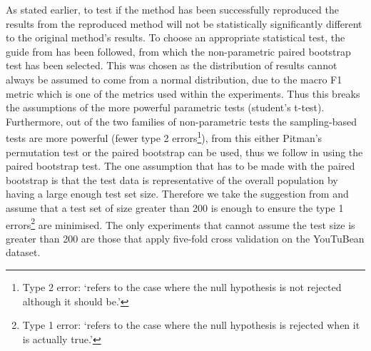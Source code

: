 As stated earlier, to test if the method has been successfully reproduced the results from the reproduced method will not be statistically significantly different to the original method's results. To choose an appropriate statistical test, the guide from \citet{dror-etal-2018-hitchhikers} has been followed, from which the non-parametric paired bootstrap test \citep{efron_1993} has been selected. This was chosen as the distribution of results cannot always be assumed to come from a normal distribution, due to the macro F1 metric \citep{dror-etal-2018-hitchhikers} which is one of the metrics used within the experiments. Thus this breaks the assumptions of the more powerful parametric tests (student's t-test). Furthermore, out of the two families of non-parametric tests the sampling-based tests are more powerful \citep{dror-etal-2018-hitchhikers, sogaard-etal-2014-whats} (fewer type 2 errors\footnote{Type 2 error: `refers to the case where the null hypothesis is not rejected although it should be.'\citep{dror-etal-2018-hitchhikers}}), from this either Pitman's permutation test or the paired bootstrap can be used, thus we follow \citet{sogaard-etal-2014-whats} in using the paired bootstrap test. The one assumption that has to be made with the paired bootstrap is that the test data is representative of the overall population by having a large enough test set size. Therefore we take the suggestion from \citet{sogaard-etal-2014-whats} and assume that a test set of size greater than 200 is enough to ensure the type 1 errors\footnote{Type 1 error: `refers to the case where the null hypothesis is rejected when it is actually true.'\citep{dror-etal-2018-hitchhikers}} are minimised. The only experiments that cannot assume the test size is greater than 200 are those that apply five-fold cross validation on the YouTuBean dataset.



